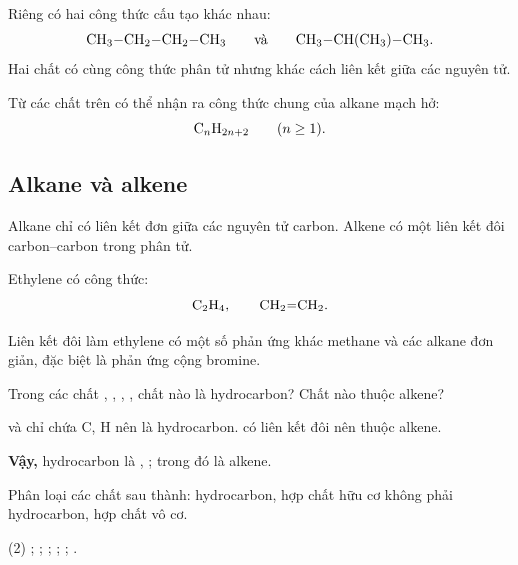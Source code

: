 Riêng  có hai công thức cấu tạo khác nhau:
\[
\ce{CH3-CH2-CH2-CH3}\qquad\text{và}\qquad\ce{CH3-CH(CH3)-CH3}.
\]
Hai chất có cùng công thức phân tử nhưng khác cách liên kết giữa các nguyên tử.

Từ các chất trên có thể nhận ra công thức chung của alkane mạch hở:
\[
\ce{C_nH_{2n+2}}\qquad (n\ge1).
\]

\subsection{Alkane và alkene}

Alkane chỉ có liên kết đơn giữa các nguyên tử carbon. Alkene có một liên kết đôi carbon--carbon trong phân tử.

Ethylene có công thức:
\[
\ce{C2H4},\qquad \ce{CH2=CH2}.
\]

Liên kết đôi làm ethylene có một số phản ứng khác methane và các alkane đơn giản, đặc biệt là phản ứng cộng bromine.

\begin{vidu}
Trong các chất , , , , chất nào là hydrocarbon? Chất nào thuộc alkene?
\end{vidu}
\begin{loigiai}
 và  chỉ chứa C, H nên là hydrocarbon.  có liên kết đôi  nên thuộc alkene.

\textbf{Vậy,} hydrocarbon là , ; trong đó  là alkene.
\end{loigiai}

\begin{tuluyen}
Phân loại các chất sau thành: hydrocarbon, hợp chất hữu cơ không phải hydrocarbon, hợp chất vô cơ.
\begin{tasks}(2)
\task {};
\task {};
\task {};
\task {};
\task {};
\task {}.
\end{tasks}
\end{tuluyen}
